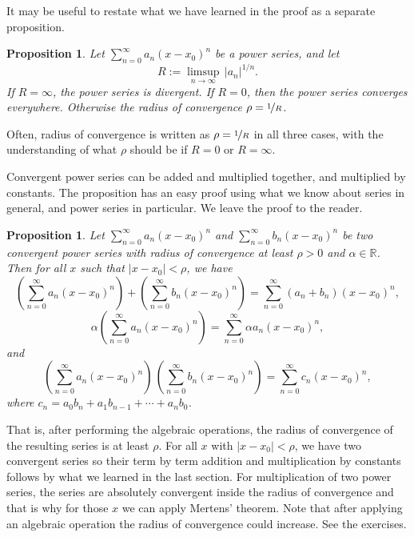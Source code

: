 \documentclass[12pt]{book}
\newcommand{\abs}[1]{\left\lvert {#1} \right\rvert}
\newcommand{\R}{{\mathbb{R}}}
\theoremstyle{plain}
\newtheorem{prop}[thm]{Proposition}
\theoremstyle{remark}
\theoremstyle{definition}
\theoremstyle{exercise}
\theoremstyle{example}
\begin{document}
It may be useful to restate what we have learned in the proof
as a separate proposition.

\begin{prop}
Let $\sum_{n=0}^\infty a_n {(x-x_0)}^n$ be a power series, and let
\begin{equation*}
R := \limsup_{n\to\infty} \, {\abs{a_n}}^{1/n} .
\end{equation*}
If $R = \infty$, the power series is divergent.  If
$R=0$, then the power series converges everywhere.   Otherwise
the radius of convergence $\rho = \nicefrac{1}{R}$.
\end{prop}

Often, radius of convergence is written as $\rho = \nicefrac{1}{R}$ in all
three cases, with
the understanding of what $\rho$ should be if $R = 0$ or $R =
\infty$.

Convergent power series can be added and multiplied together, and multiplied
by constants.
The proposition has an easy proof using what we know about series
in general, and power series in particular.  We leave the proof to the reader.

\begin{prop}
Let $\sum_{n=0}^\infty a_n {(x-x_0)}^n$ and
$\sum_{n=0}^\infty b_n {(x-x_0)}^n$ be two convergent power series
with radius of convergence at least $\rho > 0$ and $\alpha \in \R$.  Then
for all $x$ such that $\abs{x-x_0} < \rho$, we have 
\begin{equation*}
\left(\sum_{n=0}^\infty a_n {(x-x_0)}^n\right)
+
\left(\sum_{n=0}^\infty b_n {(x-x_0)}^n\right)
=
\sum_{n=0}^\infty (a_n+b_n) {(x-x_0)}^n ,
\end{equation*}
\begin{equation*}
\alpha
\left(\sum_{n=0}^\infty a_n {(x-x_0)}^n\right)
=
\sum_{n=0}^\infty \alpha a_n {(x-x_0)}^n ,
\end{equation*}
and
\begin{equation*}
\left(\sum_{n=0}^\infty a_n {(x-x_0)}^n\right)
\,
\left(\sum_{n=0}^\infty b_n {(x-x_0)}^n\right)
=
\sum_{n=0}^\infty c_n {(x-x_0)}^n ,
\end{equation*}
where
$c_n = a_0b_n + a_1 b_{n-1} + \cdots + a_n b_0$.
\end{prop}

That is, after performing the algebraic operations, the
radius of convergence of the resulting series is at least $\rho$.
For all $x$ with $\abs{x-x_0} < \rho$, we have two convergent series so
their term by term addition and multiplication by constants
follows by what we learned in the last section.
For multiplication of two power series,
the series are absolutely convergent inside
the radius of convergence and that is why for those $x$
we can apply Mertens' theorem.
Note that after applying an algebraic operation the radius of convergence
could increase.  See the exercises.
\end{document}
